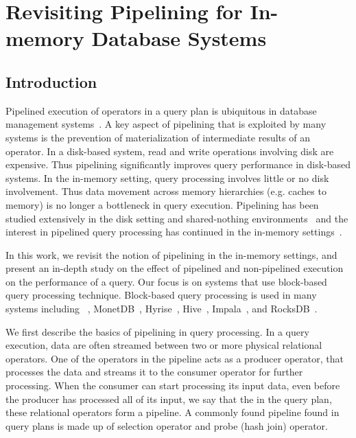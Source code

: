 \chapter{Revisiting Pipelining for In-memory Database Systems}\label{chap:pipeline}
\section{Introduction}

Pipelined execution of operators in a query plan is ubiquitous in database management systems~\cite{monetdb, hyper, quickstep-system, wang2016elastic, vectorwise}. 
A key aspect of pipelining that is exploited by many systems is the prevention of materialization of intermediate results of an operator.  
In a disk-based system, read and write operations involving disk are expensive.
Thus pipelining significantly improves query performance in disk-based systems. 
In the in-memory setting, query processing involves little or no disk involvement. 
Thus data movement across memory hierarchies (e.g. caches to memory) is no longer a bottleneck in query execution.
Pipelining has been studied extensively in the disk setting and shared-nothing environments~\cite{DBLP:journals/tkde/ChenLYY95, DBLP:conf/icde/DeshpandeH08, DBLP:conf/sigmod/DeWittGS88, gerber1986phd, Volcano, DBLP:conf/vldb/SchneiderD90} and the interest in pipelined query processing has continued in the in-memory settings~\cite{hyper-pipelining, DBLP:conf/cloud/LiuB15,  wang2016elastic, DBLP:journals/dpd/WilschutA93}.

In this work, we revisit the notion of pipelining in the in-memory settings, and present an in-depth study on the effect of pipelined and non-pipelined execution on the performance of a query. 
Our focus is on systems that use block-based query processing technique.
Block-based query processing is used in many systems including \sys{}~\cite{quickstep-system}, MonetDB~\cite{monetdb}, Hyrise~\cite{hyrise-website}, Hive~\cite{hive}, Impala~\cite{impala}, and RocksDB~\cite{rocksdb}.

We first describe the basics of pipelining in query processing. 
In a query execution, data are often streamed between two or more physical relational operators. 
One of the operators in the pipeline acts as a producer operator, that processes the data and streams it to the consumer operator for further processing. 
When the consumer can start processing its input data, even before the producer has processed all of its input, we say that the in the query plan, these relational operators form a pipeline.
A commonly found pipeline found in query plans is made up of selection operator and probe (hash join) operator.

